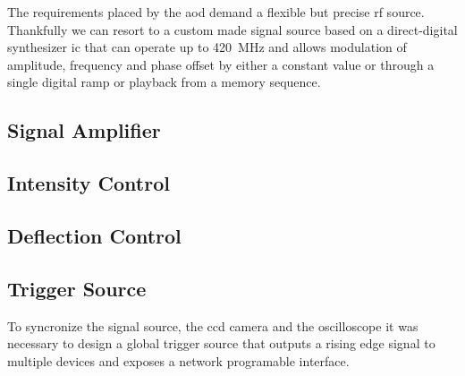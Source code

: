 The requirements placed by the \gls{aod} demand a flexible but precise
\gls{rf} source. Thankfully we can resort to a custom made signal source
based on a direct-digital synthesizer \cite{AD9910} \gls{ic} that can operate
up to \SI{420}{\mega\hertz} and allows modulation of amplitude, frequency and
phase offset by either a constant value or through a single digital ramp or
playback from a memory sequence.


\subsection{Signal Amplifier}


\subsection{Intensity Control}


\subsection{Deflection Control}


\subsection{Trigger Source}

To syncronize the signal source, the \gls{ccd} camera and the oscilloscope
it was necessary to design a global trigger source that outputs a rising edge
signal to multiple devices and exposes a network programable interface.
